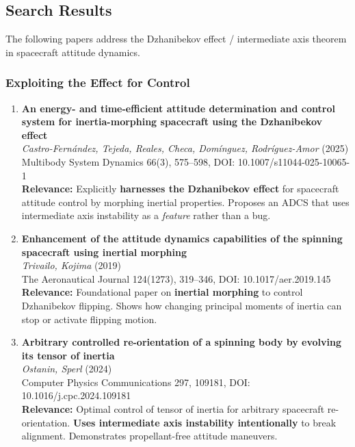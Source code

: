 \documentclass[11pt]{article}
\begin{document}
\subsection{Search Results}
The following papers address the Dzhanibekov effect / intermediate axis theorem in spacecraft attitude dynamics.

\subsubsection{Exploiting the Effect for Control}

\begin{enumerate}[label=\textbf{\arabic*.}]
    \item \textbf{An energy- and time-efficient attitude determination and control system for inertia-morphing spacecraft using the Dzhanibekov effect}\\
    \textit{Castro-Fern\'{a}ndez, Tejeda, Reales, Checa, Dom\'{i}nguez, Rodr\'{i}guez-Amor} (2025)\\
    Multibody System Dynamics 66(3), 575--598, DOI: 10.1007/s11044-025-10065-1\\
    \textbf{Relevance:} Explicitly \textbf{harnesses the Dzhanibekov effect} for spacecraft attitude control by morphing inertial properties. Proposes an ADCS that uses intermediate axis instability as a \textit{feature} rather than a bug.

    \item \textbf{Enhancement of the attitude dynamics capabilities of the spinning spacecraft using inertial morphing}\\
    \textit{Trivailo, Kojima} (2019)\\
    The Aeronautical Journal 124(1273), 319--346, DOI: 10.1017/aer.2019.145\\
    \textbf{Relevance:} Foundational paper on \textbf{inertial morphing} to control Dzhanibekov flipping. Shows how changing principal moments of inertia can stop or activate flipping motion.

    \item \textbf{Arbitrary controlled re-orientation of a spinning body by evolving its tensor of inertia}\\
    \textit{Ostanin, Sperl} (2024)\\
    Computer Physics Communications 297, 109181, DOI: 10.1016/j.cpc.2024.109181\\
    \textbf{Relevance:} Optimal control of tensor of inertia for arbitrary spacecraft re-orientation. \textbf{Uses intermediate axis instability intentionally} to break alignment. Demonstrates propellant-free attitude maneuvers.


\end{enumerate}
\end{document}
